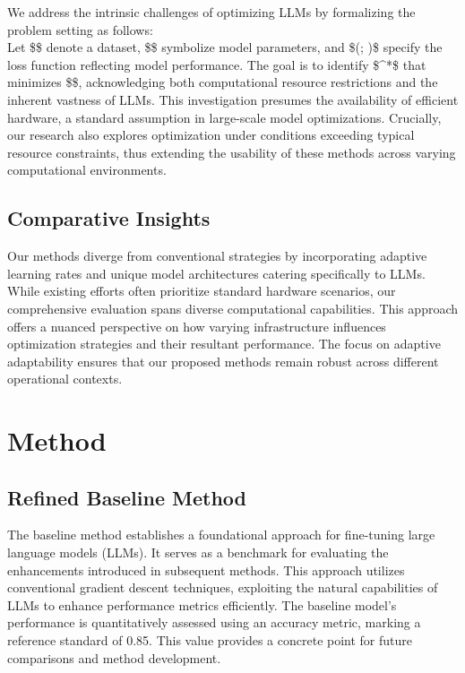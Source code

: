 \documentclass{article} %
\begin{document}
We address the intrinsic challenges of optimizing LLMs by formalizing the problem setting as follows:\\
Let \$\$ denote a dataset, \$\theta\$ symbolize model parameters, and \$(\theta; )\$ specify the loss function reflecting model performance. The goal is to identify \$\theta^*\$ that minimizes \$\$, acknowledging both computational resource restrictions and the inherent vastness of LLMs. This investigation presumes the availability of efficient hardware, a standard assumption in large-scale model optimizations. Crucially, our research also explores optimization under conditions exceeding typical resource constraints, thus extending the usability of these methods across varying computational environments.

\subsection{Comparative Insights}

Our methods diverge from conventional strategies by incorporating adaptive learning rates and unique model architectures catering specifically to LLMs. While existing efforts often prioritize standard hardware scenarios, our comprehensive evaluation spans diverse computational capabilities. This approach offers a nuanced perspective on how varying infrastructure influences optimization strategies and their resultant performance. The focus on adaptive adaptability ensures that our proposed methods remain robust across different operational contexts.

\section{Method}
\label{sec:method}
\subsection{Refined Baseline Method}

The baseline method establishes a foundational approach for fine-tuning large language models (LLMs). It serves as a benchmark for evaluating the enhancements introduced in subsequent methods. This approach utilizes conventional gradient descent techniques, exploiting the natural capabilities of LLMs to enhance performance metrics efficiently. The baseline model's performance is quantitatively assessed using an accuracy metric, marking a reference standard of 0.85. This value provides a concrete point for future comparisons and method development.
\end{document}
